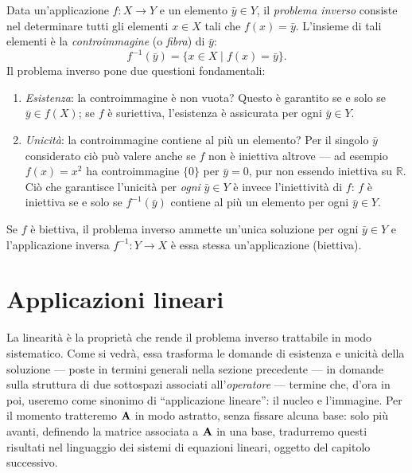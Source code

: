 Data un'applicazione $f: X \to Y$ e un elemento $\bar{y} \in Y$, il \textit{problema inverso} consiste nel determinare tutti gli elementi $x \in X$ tali che $f(x) = \bar{y}$. L'insieme di tali elementi \`e la \textit{controimmagine} (o \textit{fibra}) di $\bar{y}$:
\begin{equation}
	f^{-1}(\bar{y}) = \{x \in X \mid f(x) = \bar{y}\}.
\end{equation}
Il problema inverso pone due questioni fondamentali:
\begin{enumerate}[label=(\roman*)]
	\item \textit{Esistenza}: la controimmagine \`e non vuota? Questo \`e garantito se e solo se $\bar{y} \in f(X)$; se $f$ \`e suriettiva, l'esistenza \`e assicurata per ogni $\bar{y} \in Y$.
	\item \textit{Unicit\`a}: la controimmagine contiene al pi\`u un elemento? Per il singolo $\bar{y}$ considerato ci\`o pu\`o valere anche se $f$ non \`e iniettiva altrove --- ad esempio $f(x)=x^2$ ha controimmagine $\{0\}$ per $\bar{y}=0$, pur non essendo iniettiva su $\mathbb{R}$. Ci\`o che garantisce l'unicit\`a per \textit{ogni} $\bar{y}\in Y$ \`e invece l'iniettivit\`a di $f$: $f$ \`e iniettiva se e solo se $f^{-1}(\bar{y})$ contiene al pi\`u un elemento per ogni $\bar{y}\in Y$.
\end{enumerate}
Se $f$ \`e biettiva, il problema inverso ammette un'unica soluzione per ogni $\bar{y} \in Y$ e l'applicazione inversa $f^{-1}: Y \to X$ \`e essa stessa un'applicazione (biettiva).




\section{Applicazioni lineari}\label{sec:applicazioni_lineari}
La linearità è la proprietà che rende il problema inverso 	trattabile in modo sistematico. Come si vedrà, essa trasforma 	le domande di esistenza e unicità della soluzione --- poste in termini generali nella sezione precedente --- in domande 	sulla struttura di due sottospazi associati all'\textit{operatore} --- termine che, d'ora in poi, useremo come sinonimo di ``applicazione lineare'': il nucleo e l'immagine. Per il momento tratteremo $\mathbf{A}$ in modo astratto, senza fissare alcuna base: solo più avanti, definendo la matrice associata a $\mathbf{A}$ in una base, tradurremo questi risultati nel linguaggio dei sistemi di equazioni lineari, oggetto del capitolo successivo.


